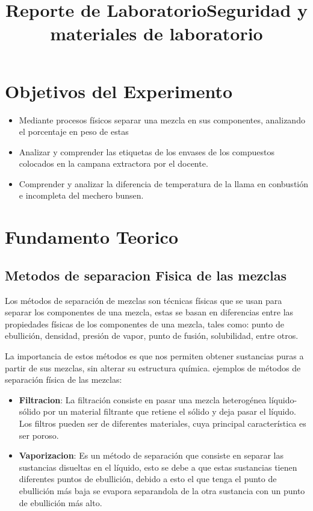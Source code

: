 \documentclass[10pt]{article}
\title{Reporte de Laboratorio}
\title{Seguridad y materiales de laboratorio}
\begin{document}


\tableofcontents

\newpage

\section{Objetivos del Experimento}

\begin{itemize}
	\item Mediante procesos físicos separar una mezcla en sus componentes, analizando el porcentaje en peso de estas
	\item Analizar y comprender las etiquetas de los envases de los compuestos colocados en la campana extractora por el docente.
	\item Comprender y analizar la diferencia de temperatura de la llama en conbusti\'on e incompleta del mechero bunsen.
\end{itemize}

\section{Fundamento Teorico}
\subsection{Metodos de separacion Fisica de las mezclas}
Los métodos de separación de mezclas son técnicas físicas que se usan para separar los componentes de una mezcla, estas se basan en diferencias entre las propiedades físicas de los componentes de una mezcla, tales como: punto de ebullición, densidad, presión de vapor, punto de fusión, solubilidad, entre otros.

La importancia de estos métodos es que nos permiten obtener sustancias puras a partir de sus mezclas, sin alterar su estructura química.
ejemplos de métodos de separación física de las mezclas:
\begin{itemize}
	\item \textbf{Filtracion}: La filtración consiste en pasar una mezcla heterogénea líquido-sólido por un material filtrante que retiene el sólido y deja pasar el líquido. Los filtros pueden ser de diferentes materiales, cuya principal característica es ser poroso.
	\item \textbf{Vaporizacion}:  Es un método de separación que consiste en separar las sustancias disueltas en el líquido, esto se debe a que estas sustancias tienen diferentes puntos de ebullición, debido a esto el que tenga el punto de ebullición más baja se evapora separandola de la otra sustancia con un punto de ebullición más alto.
\end{itemize}
\end{document}
